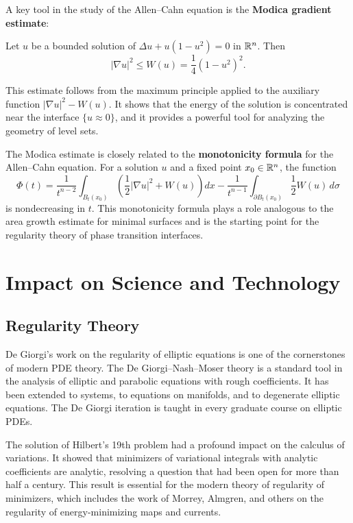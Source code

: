 A key tool in the study of the Allen--Cahn equation is the \textbf{Modica gradient estimate}:

\begin{lemma}[Modica, 1987]
Let \(u\) be a bounded solution of \(\Delta u + u(1-u^2) = 0\) in \(\mathbb{R}^n\). Then
\[
|\nabla u|^2 \leq W(u) = \frac{1}{4}(1-u^2)^2.
\]
\end{lemma}

This estimate follows from the maximum principle applied to the auxiliary function \(|\nabla u|^2 - W(u)\). It shows that the energy of the solution is concentrated near the interface \(\{u \approx 0\}\), and it provides a powerful tool for analyzing the geometry of level sets.

The Modica estimate is closely related to the \textbf{monotonicity formula} for the Allen--Cahn equation. For a solution \(u\) and a fixed point \(x_0 \in \mathbb{R}^n\), the function
\[
\Phi(t) = \frac{1}{t^{n-2}} \int_{B_t(x_0)} \left( \frac{1}{2} |\nabla u|^2 + W(u) \right) dx - \frac{1}{t^{n-1}} \int_{\partial B_t(x_0)} \frac{1}{2} W(u) \, d\sigma
\]
is nondecreasing in \(t\). This monotonicity formula plays a role analogous to the area growth estimate for minimal surfaces and is the starting point for the regularity theory of phase transition interfaces.

\section{Impact on Science and Technology}

\subsection{Regularity Theory}

De Giorgi's work on the regularity of elliptic equations is one of the cornerstones of modern PDE theory. The De Giorgi--Nash--Moser theory is a standard tool in the analysis of elliptic and parabolic equations with rough coefficients. It has been extended to systems, to equations on manifolds, and to degenerate elliptic equations. The De Giorgi iteration is taught in every graduate course on elliptic PDEs.

The solution of Hilbert's 19th problem had a profound impact on the calculus of variations. It showed that minimizers of variational integrals with analytic coefficients are analytic, resolving a question that had been open for more than half a century. This result is essential for the modern theory of regularity of minimizers, which includes the work of Morrey, Almgren, and others on the regularity of energy-minimizing maps and currents.

